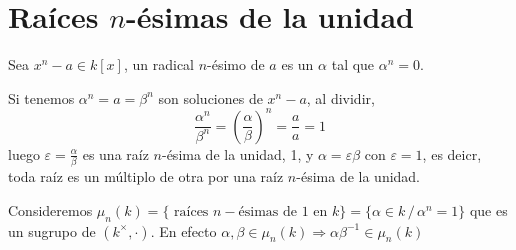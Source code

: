 \section{Ra\'ices $n$-\'esimas de la unidad}
Sea $x^n-a\in k[x]$, un radical $n$-\'esimo de $a$ es un $\alpha$ tal que $\alpha^n=0$. 

Si tenemos $\alpha^n=a=\beta^n$ son soluciones de $x^n-a$, al dividir,
$$\frac{\alpha^n}{\beta^n} = \left( \frac{\alpha}{\beta} \right)^n = \frac{a}{a}=1$$
luego $\varepsilon = \frac{\alpha}{\beta}$ es una ra\'iz $n$-\'esima de la unidad, 1, y $\alpha = \varepsilon \beta$ con $\varepsilon=1$, es deicr, toda ra\'iz es un m\'ultiplo de otra por una ra\'iz $n$-\'esima de la unidad.

Consideremos $\mu_n(k) = \{\text{ ra\'ices } n-\text{\'esimas de } 1 \text{ en } k\} = \{\alpha \in k \,/\, \alpha^n=1\}$ que es un sugrupo de $(k^{\times}, \cdot )$. En efecto
$\alpha, \beta \in \mu_n(k) \Rightarrow \alpha \beta^{-1} \in \mu_n(k)$

